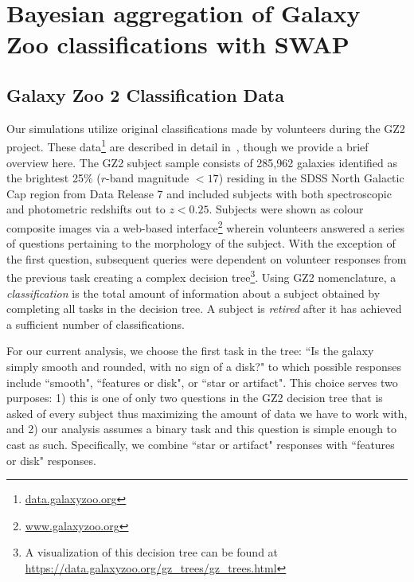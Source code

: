 
\chapter{Bayesian aggregation of Galaxy Zoo classifications with SWAP}
\label{chap:3}



\section{Galaxy Zoo 2 Classification Data} \label{sec: data}

Our simulations utilize original classifications made by volunteers during the GZ2 project. These data\footnote{\url{data.galaxyzoo.org}} are described in detail in~\cite{Willett2013}, though we provide a brief overview here.  The GZ2 subject sample consists of 285,962 galaxies identified as the brightest 25\% ($r$-band magnitude $< 17$) residing in the SDSS North Galactic Cap region from Data Release 7 and included subjects with both spectroscopic and photometric redshifts out to $z < 0.25$. Subjects were shown as colour composite images via a web-based interface\footnote{\url{www.galaxyzoo.org}} wherein volunteers answered a series of questions pertaining to the morphology of the subject. With the exception of the first question, subsequent queries were dependent on volunteer responses from the previous task creating a complex decision tree\footnote{A visualization of this decision tree can be found at \url{https://data.galaxyzoo.org/gz_trees/gz_trees.html}}. Using GZ2 nomenclature, a \textit{classification} is the total amount of information about a subject obtained by completing all tasks in the decision tree. A subject is \textit{retired} after it has achieved a sufficient number of classifications.


For our current analysis, we choose the first task in the tree: ``Is the galaxy simply smooth and rounded, with no sign of a disk?" to which possible responses include ``smooth", ``features or disk", or ``star or artifact". This choice serves two purposes: 1) this is one of only two questions in the GZ2 decision tree that is asked of every subject thus maximizing the amount of data we have to work with, and 2) our analysis assumes a binary task and this question is simple enough to cast as such. Specifically, we combine ``star or artifact" responses with ``features or disk" responses.

